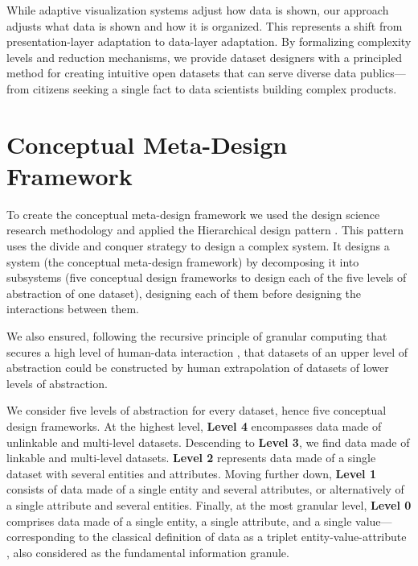 \documentclass[Afour,times,sageh]{sagej}
\begin{document}
\vspace{1em}

\noindent While adaptive visualization systems adjust how data is shown, our approach adjusts what data is shown and how it is organized. This represents a shift from presentation-layer adaptation to data-layer adaptation. By formalizing complexity levels and reduction mechanisms, we provide dataset designers with a principled method for creating intuitive open datasets that can serve diverse data publics---from citizens seeking a single fact to data scientists building complex products.

\section{Conceptual Meta-Design Framework}
\label{sec:framework}

To create the conceptual meta-design framework we used the design science research methodology \citep{hevner2004} and applied the Hierarchical design pattern \citep{vaishnavi2015}. This pattern uses the divide and conquer strategy to design a complex system. It designs a system (the conceptual meta-design framework) by decomposing it into subsystems (five conceptual design frameworks to design each of the five levels of abstraction of one dataset), designing each of them before designing the interactions between them.

\vspace{1em}

\noindent We also ensured, following the recursive principle of granular computing that secures a high level of human-data interaction \citep{wilke2016}, that datasets of an upper level of abstraction could be constructed by human extrapolation of datasets of lower levels of abstraction.

\vspace{1em}

\noindent We consider five levels of abstraction for every dataset, hence five conceptual design frameworks. At the highest level, \textbf{Level 4} encompasses data made of unlinkable and multi-level datasets. Descending to \textbf{Level 3}, we find data made of linkable and multi-level datasets. \textbf{Level 2} represents data made of a single dataset with several entities and attributes. Moving further down, \textbf{Level 1} consists of data made of a single entity and several attributes, or alternatively of a single attribute and several entities. Finally, at the most granular level, \textbf{Level 0} comprises data made of a single entity, a single attribute, and a single value---corresponding to the classical definition of data as a triplet entity-value-attribute \citep{redman1997}, also considered as the fundamental information granule.
\end{document}
